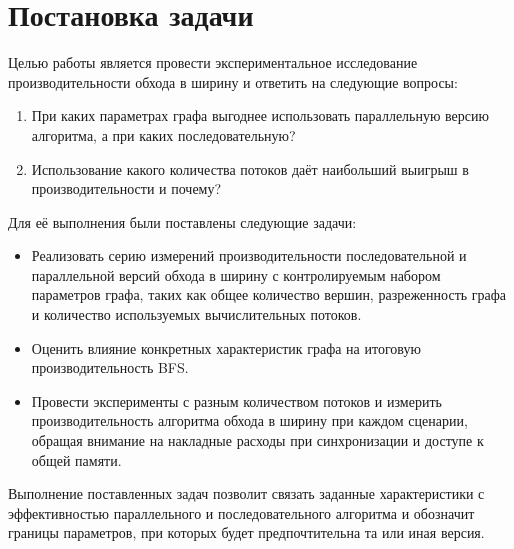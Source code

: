 
\section{Постановка задачи}
\label{sec:task}
 Целью работы является провести экспериментальное исследование производительности обхода в ширину и ответить на следующие вопросы: 
\begin{enumerate}
    \item При каких параметрах графа выгоднее использовать параллельную версию алгоритма, а при каких последовательную?
    \item Использование какого количества потоков даёт наибольший выигрыш в производительности и почему?
\end{enumerate}

 Для её выполнения были постав\-лены следующие задачи:
 \begin{itemize}
 \item  Реализовать серию измерений производительности последовательной и параллельной версий обхода в ширину с контролируемым набором параметров графа, таких как общее количество вершин, разреженность графа и количество используемых вычислительных потоков.
 \item  Оценить влияние конкретных характеристик графа на итоговую производительность BFS.
 \item  Провести эксперименты с разным количеством потоков и измерить производительность алгоритма обхода в ширину при каждом сценарии, обращая внимание на накладные расходы при синхронизации и доступе к общей памяти.
 \end{itemize}

Выполнение поставленных задач позволит связать заданные характеристики с эффективностью параллельного и последовательного алгоритма и обозначит границы параметров, при которых будет предпочтительна та или иная версия.